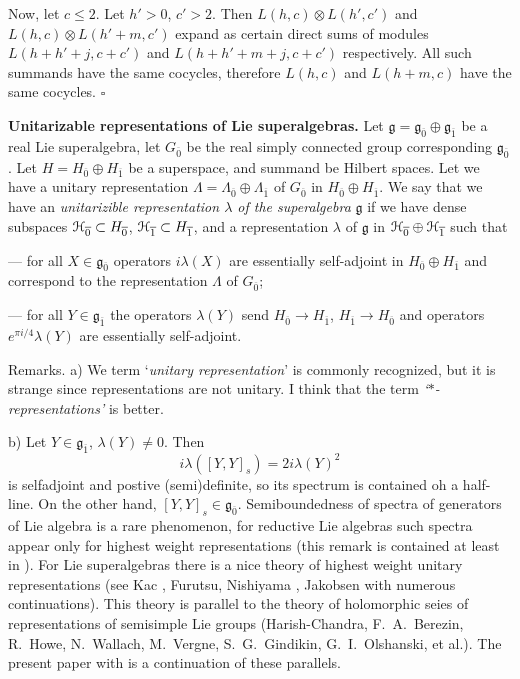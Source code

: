 \documentclass[]{amsart}
\newcounter{sec}
\newcounter{punct}[sec]
\def\punct{\refstepcounter{punct}{\arabic{sec}.\arabic{punct}.  }}
\def\le{\leqslant}
\def\cH{\EuScript H}
\def\frg{\mathfrak g}
\def\ov{\overline}
\def\sm{\smallskip}
\def\0{{\ov 0}}
\def\1{{\ov 1}}
\begin{document}
Now, let $c\le 2$. Let $h'>0$, $c'>2$.
Then $L(h,c)\otimes L(h',c')$ and $L(h,c)\otimes L(h'+m,c')$
expand as certain direct sums of modules $L(h+h'+j,c+c')$ and
$L(h+h'+m+j,c+c')$ respectively. All such summands have the same cocycles,
therefore $L(h,c)$ and $L(h+m,c)$ have the same cocycles.
\hfill $\square$

\sm

{\bf \punct Unitarizable representations of Lie superalgebras.}
Let $\frg=\frg_\0\oplus \frg_\1$ be a real Lie superalgebra,
let $G_\0$ be  the real simply connected group
corresponding $\frg_\0$. 
Let $H=H_\0\oplus H_\1$ be a superspace, and summand be  Hilbert spaces.
Let we have a unitary representation
$\Lambda=\Lambda_\0\oplus \Lambda_\1$ of $G_\0$ in $H_\0\oplus H_\1$.
We say that we have an {\it unitarizible representation
$\lambda$ of the superalgebra} $\frg$ if we have dense subspaces
$\cH_\0\subset H_\0$,  $\cH_\1\subset H_\1$,
and a representation $\lambda$ of $\frg$ in $\cH_\0\oplus \cH_\1$
such that

\sm 

--- for all $X\in \frg_\0$ operators $i\lambda(X)$ are essentially self-adjoint in $H_\0\oplus H_\1$
and correspond to the representation $\Lambda$ of $G_\0$;

\sm

--- for all  $Y\in \frg_\1$ the operators $\lambda(Y)$
send $H_\0\to H_\1$, $H_\1\to H_\0$
and operators $e^{\pi i/4} \lambda(Y)$
are essentially self-adjoint. 

\sm 

{\sc Remarks.} a) We term `{\it unitary representation}' 
is commonly recognized, but it is strange since representations are not 
unitary. I think that the term {\it `$*$-representations'}
is better.

\sm


b) Let $Y\in\frg_\1$, $\lambda(Y)\ne 0$. Then 
$$i\lambda([Y,Y]_s)=2i \lambda(Y)^2$$
is selfadjoint and postive (semi)definite, so its spectrum is contained
oh a half-line. On the other hand, $[Y,Y]_s\in \frg_\0$.
Semiboundedness of spectra of generators of Lie algebra is a rare phenomenon,
 for reductive Lie algebras such spectra appear only
for highest weight
representations (this remark is contained at least in \cite{FrH}). For Lie superalgebras
there is a nice theory of highest weight unitary representations 
(see Kac \cite{Kac}, Furutsu, Nishiyama \cite{FuNi}, Jakobsen \cite{Jak}
with numerous continuations). This theory
is
parallel to  the theory of holomorphic seies of representations of semisimple Lie groups
(Harish-Chandra, F.~A.~Berezin, R.~Howe, N.~Wallach, M.~Vergne, S.~G.~Gindikin,
G.~I.~Olshanski,   et  al.). 
The present paper with \cite{Ner-super} is a continuation of these parallels.
\end{document}
